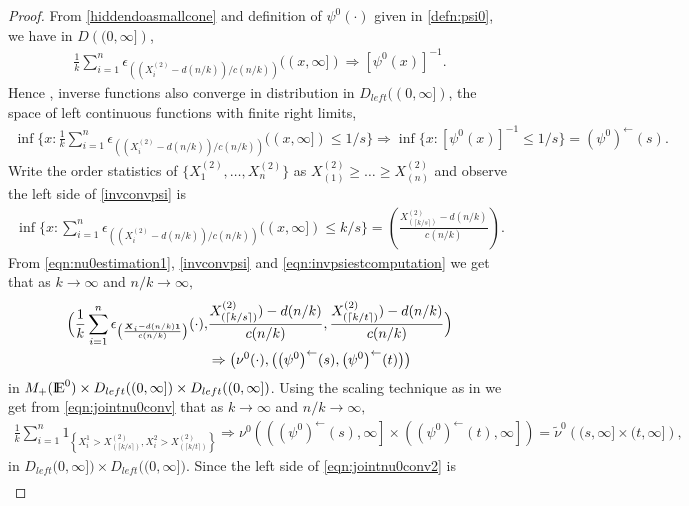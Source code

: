 \documentclass[11 pt]{amsart}
\numberwithin{equation}{section}
\begin{document}
{{\begin{proof}
From \eqref{hiddendoasmallcone} and definition of $\psi^0(\cdot)$
given in \eqref{defn:psi0}, {we have} {i}n $D({(}0, \infty
{]})$,
\begin{align*}
\frac{1}{k} \sum_{i=1}^n \epsilon_{\left((X^{(2)}_i - d(n/k))/c(n/k)
  \right)}((x, \infty]) \Rightarrow {[\psi^0(x)]}^{-1} .
\end{align*}
 Hence \citep[page 58]{resnickbook:2007},  inverse functions also
 converge in distribution {i}n $D_{left}((0, \infty])$, the space
 of left continuous functions with finite right limits,
\begin{align}\label{invconvpsi}
\inf \{ x: \frac{1}{k} \sum_{i=1}^n \epsilon_{\left((X^{(2)}_i -
    d(n/k))/c(n/k) \right)}((x, \infty])  \le 1/s \}\Rightarrow \inf
\{ x: {[\psi^0(x)]}^{-1} \le 1/s \} = {\left(\psi^0
  \right)}^{\leftarrow}(s). 
\end{align}
{Write the order statistics of $\{X_1^{(2)},\dots,X_n^{(2)}\}$ as
$X_{(1)}^{(2)} \geq \dots \geq X_{(n)}^{(2)}$ and}
observe {the left side of \eqref{invconvpsi} is}
\begin{align}\label{eqn:invpsiestcomputation}
\inf \{ x:
\sum_{i=1}^n \epsilon_{\left((X^{(2)}_i - d(n/k))/c(n/k) \right)}((x,
\infty])  \le k/s \} 
= \left(\frac{X^{(2)}_{(\lceil k/s \rceil)} - d(n/k)}{c(n/k)} \right).
\end{align}
From \eqref{eqn:nu0estimation1}, \eqref{invconvpsi} and
\eqref{eqn:invpsiestcomputation} we get that as $k \to \infty$ and
$n/k \to \infty,$ 
\begin{align}\label{eqn:jointnu0conv}
\Bigl( \frac{1}{k} \sum_{i=1}^n \epsilon_{\left( \frac{{\boldsymbol X}_i -
        d(n/k){\boldsymbol 1}}{c(n/k)}\right)}(\cdot),  &
\frac{ X^{(2)}_{(\lceil k/s \rceil)} ) - d(n/k)}{c(n/k)}, 
\frac{ X^{(2)}_{(\lceil k/t \rceil)} ) - d(n/k)}{c(n/k)} \Bigr)
\nonumber \\
&\Rightarrow 
\left( \nu^0(\cdot), \left( {\left(\psi^0
      \right)}^{\leftarrow}(s), {\left(\psi^0 \right)}^{\leftarrow}(t)
  \right)\right) 
\end{align}
{i}n $M_+({\mathop{\rm I\kern -0.20em E}\nolimits}^0) \times D_{left}{(}(0,\infty] {)}\times
  D_{left}{(}(0,\infty]{)}$.
{Using the scaling technique as in \citet[page 311]{resnickbook:2007}}
we get from \eqref{eqn:jointnu0conv}  that 
as $k \to \infty$ and $n/k \to \infty,$
\begin{align}\label{eqn:jointnu0conv2}
 \frac{1}{k} \sum_{i=1}^n 1_{\left \{ X^1_i > X^{(2)}_{(\lceil k/{s} \rceil)}, X^2_i > X^{(2)}_{(\lceil k/t \rceil)} \right \} } \Rightarrow \nu^0 \left( \left({\left(\psi^0 \right)}^{\leftarrow}(s), \infty \right] \times \left({\left(\psi^0 \right)}^{\leftarrow}(t), \infty \right] \right) = \tilde \nu^0 \left( (s, \infty] \times (t, \infty] \right),
\end{align}
{i}n $D_{left}{(}0,\infty]{)}\times
  D_{left}{(}(0,\infty] {)}$. Since the left side of
  \eqref{eqn:jointnu0conv2} is
\begin{align*}
 

\end{align*}
\end{proof}}}
\end{document}
